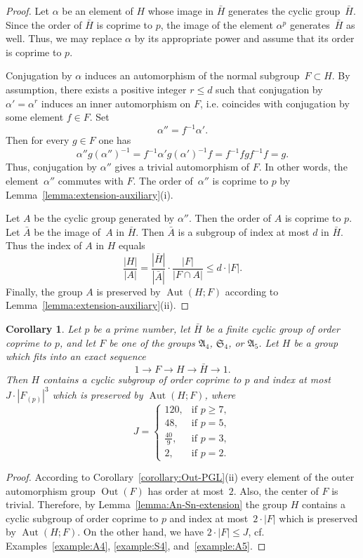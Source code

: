 \documentclass[12pt]{amsart}
\numberwithin{equation}{section}
\newtheorem{corollary}[subsection]{Corollary}
\theoremstyle{definition}
\DeclareMathOperator{\Aut}{Aut}
\DeclareMathOperator{\Out}{Out}
\def \ge {\geqslant}
\def \le {\leqslant}
\begin{document}
\begin{proof}
Let $\alpha$ be an element of $H$ whose image in $\bar{H}$ generates the cyclic group~$\bar{H}$.
Since the order of $\bar{H}$ is coprime to $p$, the image of the element $\alpha^p$
generates~$\bar{H}$ as well. Thus, we may replace $\alpha$ by its appropriate power and assume that
its order is coprime to $p$.

Conjugation by $\alpha$ induces an automorphism of the normal subgroup~\mbox{$F\subset H$}.
By assumption, there exists a positive integer $r\le d$ such that
conjugation by~\mbox{$\alpha'=\alpha^r$} induces an inner automorphism on $F$, i.e. coincides with
conjugation by some element $f\in F$. Set
$$
\alpha''=f^{-1}\alpha'.
$$
Then for every $g\in F$ one has
$$
\alpha''g(\alpha'')^{-1}=f^{-1}\alpha'g(\alpha')^{-1}f=f^{-1}fgf^{-1}f=g.
$$
Thus, conjugation by $\alpha''$ gives a trivial automorphism of $F$. In other words,
the element~$\alpha''$ commutes with $F$. The order of~$\alpha''$ is coprime to $p$
by Lemma~\ref{lemma:extension-auxiliary}(i).

Let $A$ be the cyclic group generated by $\alpha''$.
Then the order of $A$ is coprime to $p$.
Let $\bar{A}$ be the image of~$A$ in
$\bar{H}$. Then
$\bar{A}$ is a subgroup of index at most $d$ in $\bar{H}$.
Thus the index of $A$ in $H$ equals
$$
\frac{|H|}{|A|}=\frac{|\bar{H}|}{|\bar{A}|}\cdot \frac{|F|}{|F\cap A|}\le d\cdot |F|.
$$
Finally, the group $A$ is preserved by $\Aut(H;F)$
according to Lemma~\ref{lemma:extension-auxiliary}(ii).
\end{proof}

\begin{corollary}\label{corollary:An-Sn-extension}
Let $p$ be a prime number, let $\bar{H}$ be a finite cyclic group of order coprime to $p$,
and let $F$ be one of the groups
$\mathfrak{A}_4$, $\mathfrak{S}_4$, or $\mathfrak{A}_5$.
Let $H$ be a group which fits into an exact sequence
$$
1\to F\to H\to \bar{H}\to 1.
$$
Then $H$ contains a cyclic subgroup of order coprime to $p$ and index at most~\mbox{$J\cdot |F_{(p)}|^3$}
which is preserved by $\Aut(H;F)$, where
$$
J=\begin{cases}
120, &\text{if\ } p\ge 7,\\
48, &\text{if\ } p=5,\\
\frac{40}{9}, &\text{if\ } p=3,\\
2, &\text{if\ } p=2.
\end{cases}
$$
\end{corollary}

\begin{proof}
According to Corollary~\ref{corollary:Out-PGL}(ii)
every element of the outer automorphism group $\Out(F)$ has order at most~$2$.
Also, the center of $F$ is trivial. Therefore, by Lemma~\ref{lemma:An-Sn-extension}
the group $H$ contains a cyclic subgroup of order coprime to $p$ and index at most~\mbox{$2\cdot |F|$} which is preserved by $\Aut(H;F)$.
On the other hand, we have $2\cdot |F|\le J$, cf. Examples~\ref{example:A4},
\ref{example:S4}, and~\ref{example:A5}.
\end{proof}
\end{document}
